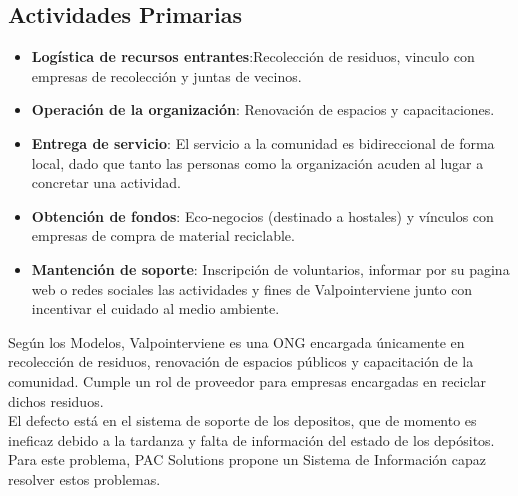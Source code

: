\documentclass[paper=letter, fontsize=11pt]{scrartcl} %
\numberwithin{equation}{section} %
\numberwithin{figure}{section} %
\numberwithin{table}{section} %
\begin{document}
\subsection*{Actividades Primarias}
\begin{itemize}
\item \textbf{Logística de recursos entrantes}:Recolección de residuos, vinculo con empresas de recolección y juntas de vecinos. 
\item \textbf{Operación de la organización}: Renovación de espacios y capacitaciones.
\item \textbf{Entrega de servicio}: El servicio a la comunidad es bidireccional de forma local, dado que tanto las personas como la organización acuden al lugar a concretar una actividad.
\item \textbf{Obtención de fondos}: Eco-negocios (destinado a hostales) y vínculos con empresas de compra de material reciclable.
\item \textbf{Mantención de soporte}: Inscripción de voluntarios, informar por su pagina web o redes sociales las actividades y fines de Valpointerviene junto con incentivar el cuidado al medio ambiente.
\end{itemize}

Según los Modelos, Valpointerviene es una ONG encargada únicamente en recolección de residuos, renovación de espacios públicos y capacitación de la comunidad. Cumple un rol de proveedor para empresas encargadas en reciclar dichos residuos.\\

El defecto está en el sistema de soporte de los depositos, que de momento es ineficaz debido a la tardanza y falta de información del estado de los depósitos. Para este problema, PAC Solutions propone un Sistema de Información capaz resolver estos problemas.
\end{document}
